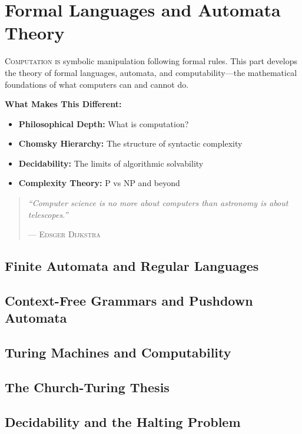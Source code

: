 \part{Formal Languages and Automata Theory}
\label{part:formal-languages}

\begin{partintro}
\lettrine[lines=3]{C}{omputation is} symbolic manipulation following formal rules. This part develops the theory of formal languages, automata, and computability—the mathematical foundations of what computers can and cannot do.

\vspace{1em}
\textbf{What Makes This Different:}
\begin{itemize}[noitemsep]
    \item \textbf{Philosophical Depth:} What is computation?
    \item \textbf{Chomsky Hierarchy:} The structure of syntactic complexity
    \item \textbf{Decidability:} The limits of algorithmic solvability
    \item \textbf{Complexity Theory:} P vs NP and beyond
\end{itemize}

\begin{quote}
\textit{``Computer science is no more about computers than astronomy is about telescopes.''}

\hfill--- \textsc{Edsger Dijkstra}
\end{quote}
\end{partintro}

\chapter{Finite Automata and Regular Languages}
\chapter{Context-Free Grammars and Pushdown Automata}
\chapter{Turing Machines and Computability}
\chapter{The Church-Turing Thesis}
\chapter{Decidability and the Halting Problem}
